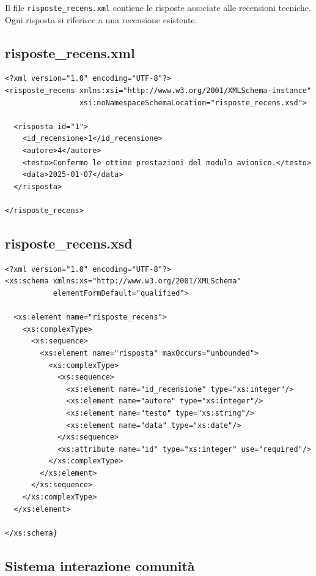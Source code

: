 \documentclass[a4paper,12pt]{report}
\begin{document}
Il file \texttt{risposte\_recens.xml} contiene le risposte associate alle recensioni tecniche.
Ogni risposta si riferisce a una recensione esistente.

\subsection*{risposte\_recens.xml}

\begin{lstlisting}
<?xml version="1.0" encoding="UTF-8"?>
<risposte_recens xmlns:xsi="http://www.w3.org/2001/XMLSchema-instance"
                 xsi:noNamespaceSchemaLocation="risposte_recens.xsd">

  <risposta id="1">
    <id_recensione>1</id_recensione>
    <autore>4</autore>
    <testo>Confermo le ottime prestazioni del modulo avionico.</testo>
    <data>2025-01-07</data>
  </risposta>

</risposte_recens>
\end{lstlisting}

\subsection*{risposte\_recens.xsd}

\begin{lstlisting}
<?xml version="1.0" encoding="UTF-8"?>
<xs:schema xmlns:xs="http://www.w3.org/2001/XMLSchema"
           elementFormDefault="qualified">

  <xs:element name="risposte_recens">
    <xs:complexType>
      <xs:sequence>
        <xs:element name="risposta" maxOccurs="unbounded">
          <xs:complexType>
            <xs:sequence>
              <xs:element name="id_recensione" type="xs:integer"/>
              <xs:element name="autore" type="xs:integer"/>
              <xs:element name="testo" type="xs:string"/>
              <xs:element name="data" type="xs:date"/>
            </xs:sequence>
            <xs:attribute name="id" type="xs:integer" use="required"/>
          </xs:complexType>
        </xs:element>
      </xs:sequence>
    </xs:complexType>
  </xs:element>

</xs:schema}
\end{lstlisting}


\subsection{Sistema interazione comunità}
\end{document}
